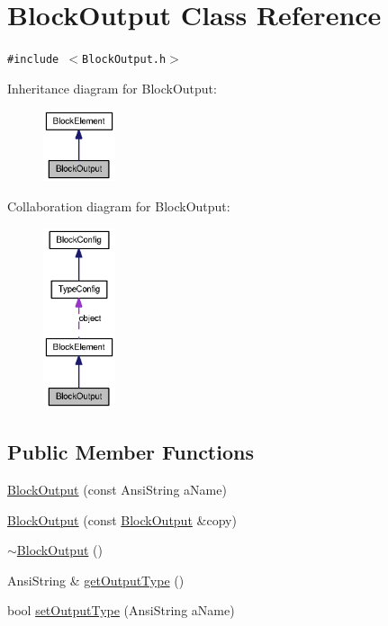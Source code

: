 \hypertarget{classBlockOutput}{
\section{BlockOutput Class Reference}
\label{classBlockOutput}
}
{\tt \#include $<$BlockOutput.h$>$}

Inheritance diagram for BlockOutput:\nopagebreak
\begin{figure}[H]
\begin{center}
\leavevmode
\includegraphics[width=60pt]{classBlockOutput__inherit__graph}
\end{center}
\end{figure}
Collaboration diagram for BlockOutput:\nopagebreak
\begin{figure}[H]
\begin{center}
\leavevmode
\includegraphics[width=60pt]{classBlockOutput__coll__graph}
\end{center}
\end{figure}
\subsection*{Public Member Functions}
\begin{CompactItemize}
\item 
\hyperlink{classBlockOutput_889e288fd7f8f4739b81681cd8975f63}{BlockOutput} (const AnsiString aName)
\item 
\hyperlink{classBlockOutput_d880f19249a89fd90bd08ec822aa6fd1}{BlockOutput} (const \hyperlink{classBlockOutput}{BlockOutput} \&copy)
\item 
\hyperlink{classBlockOutput_320d49ca840bb36f3f324730fc7af36a}{$\sim$BlockOutput} ()
\item 
AnsiString \& \hyperlink{classBlockOutput_da94ac502aea6bf1f1786e248a9d1d99}{getOutputType} ()
\item 
bool \hyperlink{classBlockOutput_9cc345b9f987e8d17bf8df7a334de8cd}{setOutputType} (AnsiString aName)
\end{CompactItemize}
